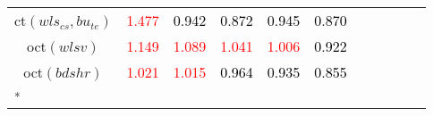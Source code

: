 \begin{tabular}[t]{c|>{}cccc>{}c|ccccc}
ct$(wls_{cs}, bu_{te})$ & \textcolor{red}{1.477} & \textcolor{black}{0.942} & \textcolor{black}{0.872} & \textcolor{black}{0.945} & \textcolor{black}{0.870} &  &  &  &  & \\
oct$(wlsv)$ & \textcolor{red}{1.149} & \textcolor{red}{1.089} & \textcolor{red}{1.041} & \textcolor{red}{1.006} & \textcolor{black}{0.922} &  &  &  &  & \\
oct$(bdshr)$ & \textcolor{red}{1.021} & \textcolor{red}{1.015} & \textcolor{black}{0.964} & \textcolor{black}{0.935} & \textcolor{black}{0.855} &  &  &  &  & \\
\bottomrule
{}\\
\end{tabular}
